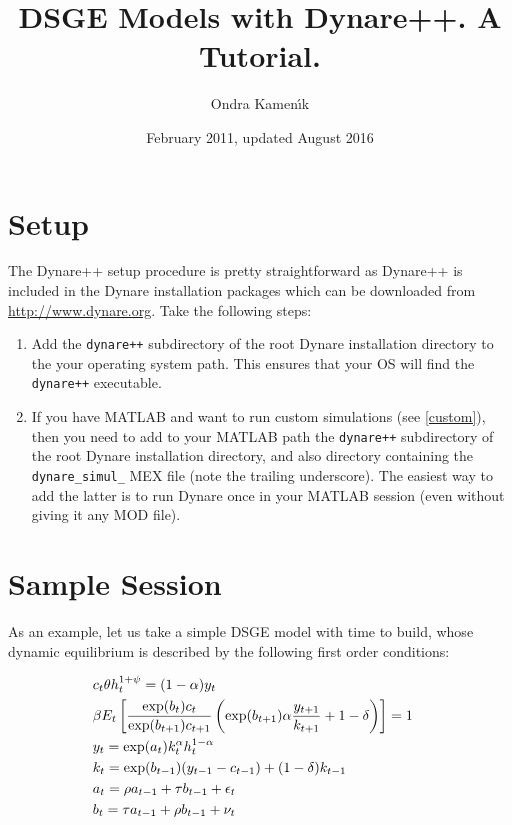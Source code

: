 \documentclass[10pt]{article}
\begin{document}
\title{DSGE Models with Dynare++. A Tutorial.}

\author{Ondra Kamen\'\i k}

\date{February 2011, updated August 2016}
\maketitle

\tableofcontents

\section{Setup}

The Dynare++ setup procedure is pretty straightforward as Dynare++ is included in the Dynare installation 
packages which can be downloaded from \url{http://www.dynare.org}. Take the following steps:
\begin{enumerate}
\item Add the {\tt dynare++} subdirectory of the root Dynare installation directory to the your
operating system path. This ensures that your OS will find the {\tt dynare++} executable.
\item If you have MATLAB and want to run custom simulations (see \ref{custom}),
  then you need to add to your MATLAB path the {\tt dynare++} subdirectory of
  the root Dynare installation directory, and also directory containing the
  \texttt{dynare\_simul\_} MEX file (note the trailing underscore). The easiest
  way to add the latter is to run Dynare once in your MATLAB session (even
  without giving it any MOD file).
\end{enumerate}

\section{Sample Session}

As an example, let us take a simple DSGE model with time to build, whose dynamic
equilibrium is described by the following first order conditions:

\begin{align*}
&c_t\theta h_t^{1+\psi} = (1-\alpha)y_t\cr
&\beta E_t\left[\frac{\exp(b_t)c_t}{\exp(b_{t+1})c_{t+1}}
\left(\exp(b_{t+1})\alpha\frac{y_{t+1}}{k_{t+1}}+1-\delta\right)\right]=1\cr
&y_t=\exp(a_t)k_t^\alpha h_t^{1-\alpha}\cr
&k_{t}=\exp(b_{t-1})(y_{t-1}-c_{t-1})+(1-\delta)k_{t-1}\cr
&a_t=\rho a_{t-1}+\tau b_{t-1}+\epsilon_t\cr
&b_t=\tau a_{t-1}+\rho b_{t-1}+\nu_t
\end{align*}
\end{document}
